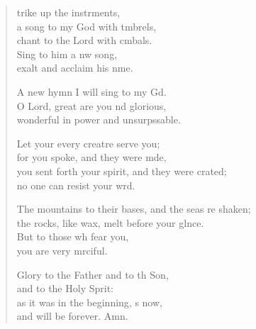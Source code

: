 \settowidth{\versewidth}{The mountains to their bases, and the seas are shaken; *}
\begin{verse}%
  \begin{patverse}
    trike up the instrments,\Flex\\
a song to my God with t\pointup{\i}mbrels,\Med\\
chant to the Lord with cmbals.\\
Sing to him a nw song,\Med\\
exalt and acclaim his nme.

A new hymn I will sing to my Gd.\Flex\\
O Lord, great are you nd glorious,\Med\\
wonderful in power and unsurpssable.

Let your every creatre serve you;\Med\\
for you spoke, and they were mde,\\
you sent forth your spirit, and they were crated;\Med\\
no one can resist your wrd.

The mountains to their bases, and the seas re shaken;\Med\\
the rocks, like wax, melt before your glnce.\\
But to those wh fear you,\Med\\
you are very mrciful.

Glory to the Father and to th Son,\Med\\
and to the Holy Sp\pointup{\i}rit:\\
as it was in the beginning, \pointup{\i}s now,\Med\\
and will be forever. Amn. 
  \end{patverse}
\end{verse}
